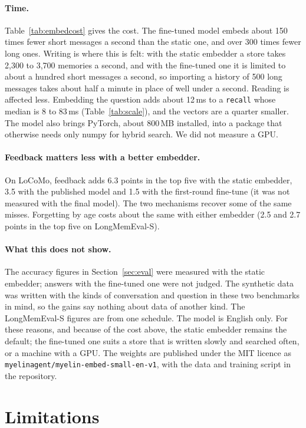 \documentclass[11pt]{article}
\begin{document}
\paragraph{Time.} Table~\ref{tab:embedcost} gives the cost. The
fine-tuned model embeds about 150 times fewer short messages a second
than the static one, and over 300 times fewer long ones. Writing is
where this is felt: with the static embedder a store takes 2{,}300 to
3{,}700 memories a second, and with the fine-tuned one it is limited
to about a hundred short messages a second, so importing a history of
500 long messages takes about half a minute in place of well under a
second. Reading is affected less. Embedding the question adds about
12\,ms to a \texttt{recall} whose median is 8 to 83\,ms
(Table~\ref{tab:scale}), and the vectors are a quarter smaller. The model also brings PyTorch, about 800\,MB
installed, into a package that otherwise needs only numpy for hybrid
search. We did not measure a GPU.

\paragraph{Feedback matters less with a better embedder.} On LoCoMo,
feedback adds 6.3 points in the top five with the static embedder, 3.5
with the published model and 1.5 with the first-round fine-tune (it
was not measured with the final model). The two mechanisms recover
some of the same misses. Forgetting by age costs about the same
with either embedder (2.5 and 2.7 points in the top five on
LongMemEval-S).

\paragraph{What this does not show.} The accuracy figures in
Section~\ref{sec:eval} were measured with the static embedder; answers
with the fine-tuned one were not judged. The synthetic data was
written with the kinds of conversation and question in these two
benchmarks in mind, so the gains say nothing about data of another
kind. The LongMemEval-S figures are from one schedule. The model is
English only. For these reasons, and because of the cost above, the
static embedder remains the default; the fine-tuned one suits a store
that is written slowly and searched often, or a machine with a GPU.
The weights are published under the MIT licence as
\texttt{myelinagent/myelin-embed-small-en-v1}, with the data and
training script in the repository.

\section{Limitations}
\end{document}
